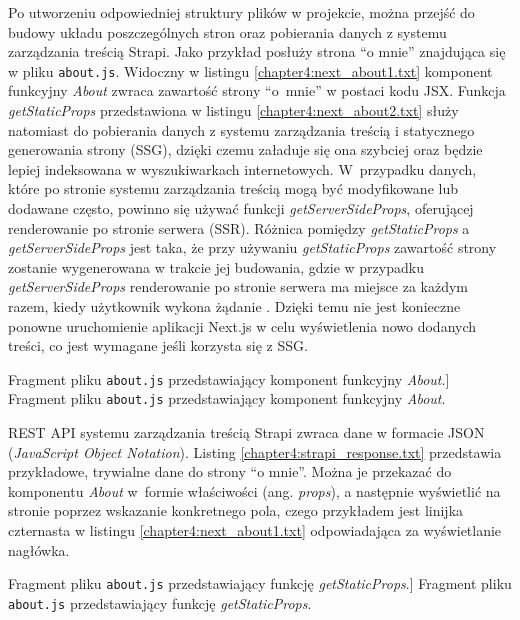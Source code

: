 \documentclass[a4paper, 12pt]{article}
\numberwithin{figure}{section}
\begin{document}
\begin{sloppypar}
Po utworzeniu odpowiedniej struktury plików w projekcie, można przejść do budowy układu poszczególnych stron oraz pobierania danych z systemu zarządzania treścią Strapi. Jako przykład posłuży strona ``o mnie'' znajdująca się w pliku \texttt{about.js}. Widoczny w listingu \ref{chapter4:next_about1.txt} komponent funkcyjny \textit{About} zwraca zawartość strony ``o~mnie'' w postaci kodu JSX. Funkcja \textit{getStaticProps} przedstawiona w listingu \ref{chapter4:next_about2.txt} służy natomiast do pobierania danych z systemu zarządzania treścią i statycznego generowania strony (SSG), dzięki czemu załaduje się ona szybciej oraz będzie lepiej indeksowana w wyszukiwarkach internetowych. W~przypadku danych, które po stronie systemu zarządzania treścią mogą być modyfikowane lub dodawane często, powinno się używać funkcji \textit{getServerSideProps}, oferującej renderowanie po stronie serwera (SSR). Różnica pomiędzy \textit{getStaticProps} a \textit{getServerSideProps} jest taka, że przy używaniu \textit{getStaticProps} zawartość strony zostanie wygenerowana w trakcie jej budowania, gdzie w przypadku \textit{getServerSideProps} renderowanie po stronie serwera ma miejsce za każdym razem, kiedy użytkownik wykona żądanie \cite{nextdocs}. Dzięki temu nie jest konieczne ponowne uruchomienie aplikacji Next.js w celu wyświetlenia nowo dodanych 
treści, co jest wymagane jeśli korzysta się z SSG. 

\begin{code}[htbp]
    
    \caption
    [Fragment pliku \texttt{about.js} przedstawiający komponent funkcyjny \textit{About}.]
    {Fragment pliku \texttt{about.js} przedstawiający komponent funkcyjny \textit{About}.}
    \label{chapter4:next_about1.txt}
\end{code}

\newpage

REST API systemu zarządzania treścią Strapi zwraca dane w formacie JSON (\textit{JavaScript Object Notation}). Listing \ref{chapter4:strapi_response.txt} przedstawia przykładowe, trywialne dane do strony ``o mnie''. Można je przekazać do komponentu \textit{About} w~formie właściwości (ang. \textit{props}), a następnie wyświetlić na stronie poprzez wskazanie konkretnego pola, czego przykładem jest linijka czternasta 
w listingu \ref{chapter4:next_about1.txt} odpowiadająca za wyświetlanie nagłówka.

\begin{code}[htbp]
    
    \caption
    [Fragment pliku \texttt{about.js} przedstawiający funkcję \textit{getStaticProps}.]
    {Fragment pliku \texttt{about.js} przedstawiający funkcję \textit{getStaticProps}.}
    \label{chapter4:next_about2.txt}
\end{code}


\end{sloppypar}
\end{document}
